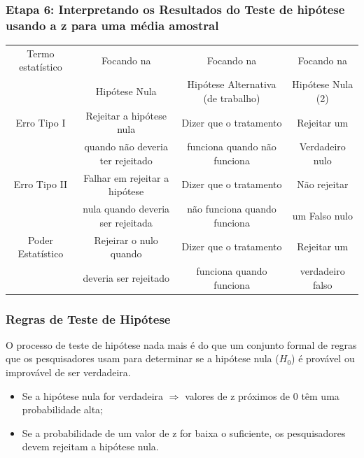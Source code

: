 \documentclass[11pt]{beamer}
\begin{document}
\begin{frame}
\frametitle{Etapa 6: Interpretando os Resultados do Teste de hipótese usando a z para uma média amostral}

\begin{center}
\tiny
\begin{tabular}{cccc} 
 \hline
Termo estatístico & Focando na & Focando na & Focando na\\
 & Hipótese Nula & Hipótese Alternativa (de trabalho) & Hipótese Nula (2)\\
 \hline
Erro Tipo I & Rejeitar a hipótese nula & Dizer que o tratamento & Rejeitar um\\
 & quando não deveria ter rejeitado & funciona quando não funciona & Verdadeiro nulo\\
Erro Tipo II & Falhar em rejeitar a hipótese & Dizer que o tratamento & Não rejeitar\\
 & nula quando deveria ser rejeitada & não funciona quando funciona & um Falso nulo\\
Poder Estatístico & Rejeirar o nulo quando & Dizer que o tratamento & Rejeitar um\\
 & deveria ser rejeitado & funciona quando funciona & verdadeiro falso\\ 
 \hline
\end{tabular}
\end{center}

\end{frame}

\begin{frame}
\frametitle{Regras de Teste de Hipótese}
O processo de teste de hipótese nada mais é do que um conjunto formal de regras que os pesquisadores usam para determinar se a hipótese nula (\(H_0\)) é provável ou improvável de ser verdadeira.

\begin{itemize}
\item Se a hipótese nula for verdadeira \(\Rightarrow\) valores de z próximos de 0 têm uma probabilidade alta; 
\item Se a probabilidade de um valor de z for baixa o suficiente, os pesquisadores devem rejeitam a hipótese nula.
\end{itemize}

\end{frame}
\end{document}
